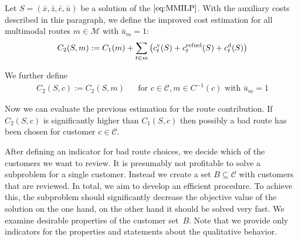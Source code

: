 \begin{definition}

Let $S=\left(\bar{x},\bar{z},\bar{e},\bar{u}\right)$ be a solution of the $\eqref{eq:MMILP}$. With the auxiliary costs described in this paragraph, we define the improved cost estimation for all multimodal routes ${m\in\mathcal{M}}$ with ${\bar{u}_m=1}$:
\begin{align*}
	C_2(S,m) := C_1(m) + \sum_{t\in m}\left(c^{\operatorname{v}}_t(S) + c^{\operatorname{refuel}}_t(S) + c^{\operatorname{d}}_t(S)\right)
\end{align*}

We further define
\begin{align*}
	C_2(S,c) := C_2(S,m) && \text{for } c\in\mathcal{C},m\in C^{-1}(c) \text{ with } \bar{u}_m = 1
\end{align*}

\end{definition}

Now we can evaluate the previous estimation for the route contribution. If $C_2(S,c)$ is significantly higher than $C_1(S,c)$ then possibly a bad route has been chosen for customer $c\in\mathcal{C}$.

After defining an indicator for bad route choices, we decide which of the customers we want to review. It is presumably not profitable to solve a subproblem for a single customer. Instead we create a set ${B\subseteq\mathcal{C}}$ with customers that are reviewed. In total, we aim to develop an efficient procedure. To achieve this, the subproblem should significantly decrease the objective value of the solution on the one hand, on the other hand it should be solved very fast. We examine desirable properties of the customer set~$B$. Note that we provide only indicators for the properties and statements about the qualitative behavior.

